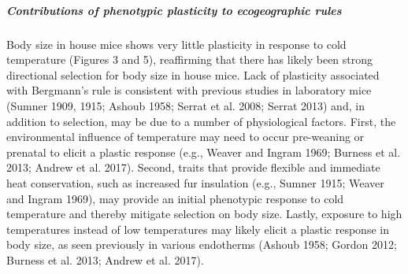 \documentclass[]{article}
\let\oldsubparagraph\subparagraph
\renewcommand{\subparagraph}[1]{\oldsubparagraph{#1}\mbox{}}
\begin{document}
\vspace{2.5mm}

\hypertarget{contributions-of-phenotypic-plasticity-to-ecogeographic-rules}{%
\subparagraph{\texorpdfstring{\emph{Contributions of phenotypic
plasticity to ecogeographic
rules}}{Contributions of phenotypic plasticity to ecogeographic rules}}\label{contributions-of-phenotypic-plasticity-to-ecogeographic-rules}}

Body size in house mice shows very little plasticity in response to cold
temperature (Figures 3 and 5), reaffirming that there has likely been
strong directional selection for body size in house mice. Lack of
plasticity associated with Bergmann's rule is consistent with previous
studies in laboratory mice (Sumner 1909, 1915; Ashoub 1958; Serrat et
al. 2008; Serrat 2013) and, in addition to selection, may be due to a
number of physiological factors. First, the environmental influence of
temperature may need to occur pre-weaning or prenatal to elicit a
plastic response (e.g., Weaver and Ingram 1969; Burness et al. 2013;
Andrew et al. 2017). Second, traits that provide flexible and immediate
heat conservation, such as increased fur insulation (e.g., Sumner 1915;
Weaver and Ingram 1969), may provide an initial phenotypic response to
cold temperature and thereby mitigate selection on body size. Lastly,
exposure to high temperatures instead of low temperatures may likely
elicit a plastic response in body size, as seen previously in various
endotherms (Ashoub 1958; Gordon 2012; Burness et al. 2013; Andrew et al.
2017).
\end{document}
